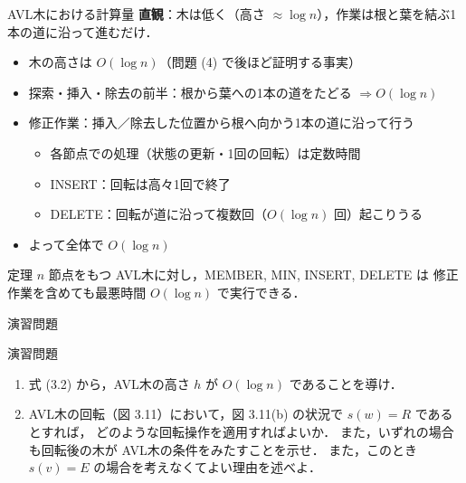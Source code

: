 \documentclass[aspectratio=169,11pt]{beamer}
\begin{document}
\begin{frame}{AVL木における計算量}
  \textbf{直観}：木は低く（高さ $\approx\log n$），作業は根と葉を結ぶ1本の道に沿って進むだけ．
  \begin{itemize}
    \item 木の高さは $O(\log n)$（\alert{問題 (4) で後ほど証明する事実}）
    \item 探索・挿入・除去の前半：根から葉への1本の道をたどる $\Rightarrow O(\log n)$
    \item 修正作業：挿入／除去した位置から根へ向かう1本の道に沿って行う
          \begin{itemize}
            \item 各節点での処理（状態の更新・1回の回転）は定数時間
            \item INSERT：回転は高々1回で終了
            \item DELETE：回転が道に沿って複数回（$O(\log n)$ 回）起こりうる
          \end{itemize}
    \item よって全体で $O(\log n)$
  \end{itemize}
  \begin{block}{定理}
    $n$ 節点をもつ AVL木に対し，MEMBER, MIN, INSERT, DELETE は
    修正作業を含めても\alert{最悪時間 $O(\log n)$} で実行できる．
  \end{block}
\end{frame}

\begin{frame}{演習問題}
  \begin{block}{演習問題}
    \begin{enumerate}
      \item[(4)] 式 (3.2) から，AVL木の高さ $h$ が $O(\log n)$ であることを導け．
      \item[(5)] AVL木の回転（図 3.11）において，図 3.11(b) の状況で $s(w)=R$ であるとすれば，
            どのような回転操作を適用すればよいか．
            また，いずれの場合も回転後の木が AVL木の条件をみたすことを示せ．
            また，このとき $s(v)=E$ の場合を考えなくてよい理由を述べよ．
    \end{enumerate}
  \end{block}
\end{frame}
\end{document}
